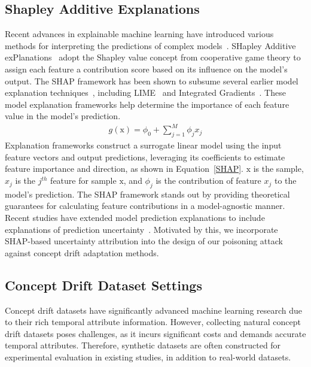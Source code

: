 \subsection{Shapley Additive Explanations}
\label{Sec: Shapley Additive Explanations}
Recent advances in explainable machine learning have introduced various methods for interpreting the predictions of complex models~\cite{ali2023explainable}.
SHapley Additive exPlanations~\cite{lundberg2017unified} adopt the Shapley value concept from cooperative game theory to assign each feature a contribution score based on its influence on the model's output.
The SHAP framework has been shown to subsume several earlier model explanation techniques~\cite{2021-Usenix-Poisoning-Attack-Explanation-guided-Backdoor}, including LIME~\cite{ribeiro2016should} and Integrated Gradients~\cite{sundararajan2017axiomatic}. 
These model explanation frameworks help determine the importance of each feature value in the model's prediction.
\begin{equation}
	\begin{aligned}
			g(\bm{\mathrm{x}}) = \phi_{0} + \sum_{j=1}^{M} \phi_{j} x_{j}
		\end{aligned}
	\label{SHAP}
\end{equation}
Explanation frameworks construct a surrogate linear model using the input feature vectors and output predictions, leveraging its coefficients to estimate feature importance and direction, as shown in Equation~\ref{SHAP}.
$\bm{\mathrm{x}}$ is the sample, $x_{j}$ is the $j^{th}$ feature for sample $\bm{\mathrm{x}}$, and $\phi_{j}$ is the contribution of feature $x_{j}$ to the model’s prediction.
The SHAP framework stands out by providing theoretical guarantees for calculating feature contributions in a model-agnostic manner.
Recent studies have extended model prediction explanations to include explanations of prediction uncertainty~\cite{NEURIPS2023_16e4be78}.
Motivated by this, we incorporate SHAP-based uncertainty attribution into the design of our poisoning attack against concept drift adaptation methods.

\subsection{Concept Drift Dataset Settings}
\label{Sec: Concept Drift Dataset Settings}
Concept drift datasets have significantly advanced machine learning research due to their rich temporal attribute information.
However, collecting natural concept drift datasets poses challenges, as it incurs significant costs and demands accurate temporal attributes.
Therefore, synthetic datasets are often constructed for experimental evaluation in existing studies, in addition to real-world datasets.

